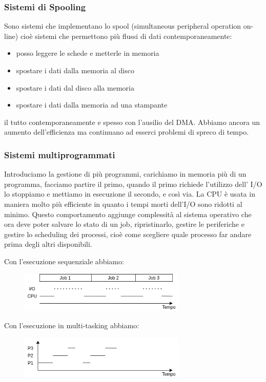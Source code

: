 \subsubsection{Sistemi di Spooling}
Sono sistemi che implementano lo spool (simultaneous peripheral operation on-line) cioè sistemi che permettono più flussi di dati contemporaneamente:
\begin{itemize}
    \item posso leggere le schede e metterle in memoria
    \item spostare i dati dalla memoria al disco
    \item spostare i dati dal disco alla memoria
    \item spostare i dati dalla memoria ad una stampante
\end{itemize}
il tutto contemporaneamente e spesso con l'ausilio del DMA. Abbiamo ancora un aumento dell'efficienza ma continuano ad esserci problemi di spreco di tempo.

\subsubsection{Sistemi multiprogrammati}
Introduciamo la gestione di più programmi, carichiamo in memoria più di un programma, facciamo partire il primo, quando il primo richiede l'utilizzo dell' I/O lo stoppiamo e mettiamo in esecuzione il secondo, e così via. La CPU è usata in maniera molto più efficiente in quanto i tempi morti dell'I/O sono ridotti al minimo. Questo comportamento aggiunge complessità al sistema operativo che ora deve poter salvare lo stato di un job, ripristinarlo, gestire le periferiche e gestire lo scheduling dei processi, cioè come scegliere quale processo far andare prima degli altri disponibili.

Con l'esecuzione sequenziale abbiamo:
\begin{figure}[H]
    \centering
    \includegraphics[width=300px]{images/1_Introduzione/esecuzione_sequenziale.png}
\end{figure}

Con l'esecuzione in multi-tasking abbiamo:
\begin{figure}[H]
    \centering
    \includegraphics[width=300px]{images/1_Introduzione/esecuzione_multi_tasking.png}
\end{figure}

